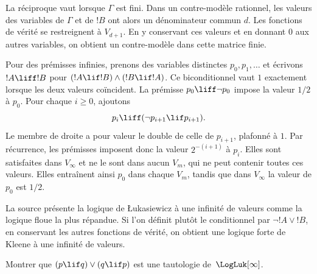\documentclass[../../../include/open-logic-section]{subfiles}
\begin{document}
La réciproque vaut lorsque $\Gamma$ est fini. Dans un
contre-modèle rationnel, les valeurs des variables de $\Gamma$
et de $!B$ ont alors un dénominateur commun $d$. Les fonctions
de vérité se restreignent à $V_{d+1}$. En y conservant ces
valeurs et en donnant $0$ aux autres variables, on obtient
un contre-modèle dans cette matrice finie.

Pour des prémisses infinies, prenons des variables distinctes
$p_0,p_1,\ldots$ et écrivons $!A\liff !B$ pour
$(!A\lif !B)\land(!B\lif !A)$. Ce biconditionnel vaut $1$
exactement lorsque les deux valeurs coïncident. La prémisse
$p_0\liff\lnot p_0$ impose la valeur $1/2$ à $p_0$.
Pour chaque $i\geq 0$, ajoutons
\[
 p_i\liff(\lnot p_{i+1}\lif p_{i+1}).
\]
Le membre de droite a pour valeur le double de celle de
$p_{i+1}$, plafonné à $1$. Par récurrence, les prémisses
imposent donc la valeur $2^{-(i+1)}$ à $p_i$. Elles sont
satisfaites dans $V_\infty$ et ne le sont dans aucun $V_m$,
qui ne peut contenir toutes ces valeurs. Elles entraînent
ainsi $p_0$ dans chaque $V_m$, tandis que dans $V_\infty$
la valeur de $p_0$ est $1/2$.

La source présente la logique de
\L ukasiewicz à une infinité de valeurs
comme la logique floue la plus répandue.
Si l'on définit plutôt le conditionnel
par $\lnot !A\lor !B$, en conservant
les autres fonctions de vérité,
on obtient une logique forte de Kleene
à une infinité de valeurs.

\begin{prob}
  Montrer que
  $(p\lif q)\lor(q\lif p)$ est
  une tautologie de~$\LogLuk[\infty]$.
\end{prob}
\end{document}
